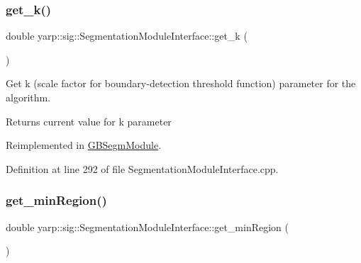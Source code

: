 \subsubsection{\texorpdfstring{get\_k()}{get\_k()}}
{\footnotesize\ttfamily double yarp\+::sig\+::\+Segmentation\+Module\+Interface\+::get\+\_\+k (\begin{DoxyParamCaption}{ }\end{DoxyParamCaption})\hspace{0.3cm}{\ttfamily [virtual]}}



Get k (scale factor for boundary-\/detection threshold function) parameter for the algorithm. 

\begin{DoxyReturn}{Returns}
current value for k parameter 
\end{DoxyReturn}


Reimplemented in \mbox{\hyperlink{classGBSegmModule_a44bab99aa7a035e57a185673c040d2f6}{G\+B\+Segm\+Module}}.



Definition at line 292 of file Segmentation\+Module\+Interface.\+cpp.


\begin{DoxyCode}{0}

\end{DoxyCode}
\mbox{\label{classyarp_1_1sig_1_1SegmentationModuleInterface_a6c184aeea894f6afcc342c5aa748429d}} 
\subsubsection{\texorpdfstring{get\_minRegion()}{get\_minRegion()}}
{\footnotesize\ttfamily double yarp\+::sig\+::\+Segmentation\+Module\+Interface\+::get\+\_\+min\+Region (\begin{DoxyParamCaption}{ }\end{DoxyParamCaption})\hspace{0.3cm}{\ttfamily [virtual]}}



